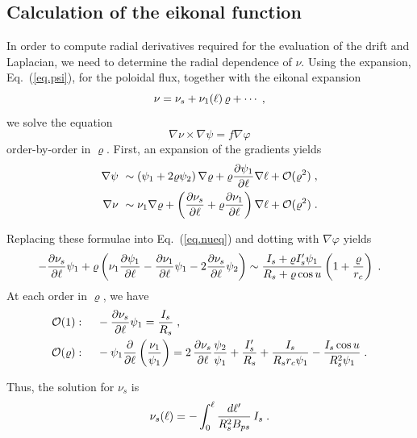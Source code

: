 \subsection{Calculation of the eikonal function}

In order to compute radial derivatives required for 
the evaluation of the drift and Laplacian, we need to 
determine the radial dependence of $\nu$.  Using the 
expansion, Eq.~(\ref{eq.psi}), for the poloidal flux, 
together with the eikonal expansion
%
\begin{equation}
\nu = \nu_s + \nu_1(\ell) \, \varrho + \cdots \; ,
\end{equation}
%
we solve the equation 
%
\begin{equation}
\nabla\nu \times \nabla\psi = f \nabla\varphi
\label{eq.nueq} 
\end{equation}
%
order-by-order in $\varrho$.  First, an expansion of 
the gradients yields
%
\begin{align}
\nabla\psi &~\sim \left( \psi_1+2\varrho \psi_2 \right) \nabla\varrho 
+ \varrho \frac{\partial\psi_1}{\partial\ell} \nabla\ell +{\mathcal O}(\varrho^2) \; , \\
\nabla\nu &~\sim \nu_1 \nabla\varrho + \left(
\frac{\partial \nu_s}{\partial\ell}+\varrho\frac{\partial \nu_1}{\partial\ell}
\right) \nabla\ell +{\mathcal O}(\varrho^2) \; .
\end{align}

\noindent
Replacing these formulae into Eq.~(\ref{eq.nueq}) and dotting with 
$\nabla\varphi$ yields
%
\begin{equation}
-\frac{\partial\nu_s}{\partial\ell} \psi_1 + \varrho
\left( \nu_1 \frac{\partial\psi_1}{\partial\ell}-
       \frac{\partial\nu_1}{\partial\ell} \psi_1 
       - 2\frac{\partial\nu_s}{\partial\ell} \psi_2 \right) \sim
\frac{I_s+\varrho I_s^\prime \psi_1}{R_s+\varrho\cos u}
\left( 1+\frac{\varrho}{r_c}\right) \; .
\end{equation}
\noindent
At each order in $\varrho$, we have
%
\begin{align}
{\mathcal O}(1):\quad &~ -\frac{\partial\nu_s}{\partial\ell}\psi_1 
 = \frac{I_s}{R_s} \; , \\
{\mathcal O}(\varrho):\quad &~ -\psi_1 \frac{\partial}{\partial\ell} \left(
\frac{\nu_1}{\psi_1} \right) 
 = 2 \, \frac{\partial \nu_s}{\partial\ell} \frac{\psi_2}{\psi_1}
  + \frac{I_s^\prime}{R_s} + \frac{I_s}{R_s r_c \psi_1} 
 - \frac{I_s\cos u}{R_s^2 \psi_1} \; .
\end{align}

\noindent
Thus, the solution for $\nu_s$ is
%
\begin{equation}
\nu_s(\ell) = -\int_0^\ell \frac{d\ell^\prime}{R_s^2 B_{ps}} \, I_s \; .
\end{equation}

